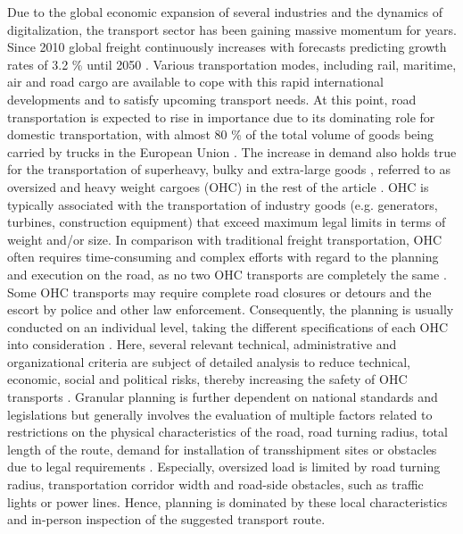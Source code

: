 
Due to the global economic expansion of several industries and the dynamics of digitalization, the transport sector has been gaining massive momentum for years.
Since 2010 global freight continuously increases with forecasts predicting growth rates of 3.2 \% until 2050 \cite{figura2020preferences, InternationalTransportForum}.
Various transportation modes, including rail, maritime, air and road cargo are available to cope with this rapid international developments and to satisfy upcoming transport needs.
At this point, road transportation is expected to rise in importance due to its dominating role for domestic transportation, with almost 80 \% of the total volume of goods being carried by trucks in the European Union \cite{Eurostat}.
The increase in demand also holds true for the transportation of superheavy, bulky and extra-large goods \cite{gavrilova2021analysis}, referred to as oversized and heavy weight cargoes (OHC) in the rest of the article \cite{Luo.2021}.
OHC is typically associated with the transportation of industry goods (e.g. generators, turbines, construction equipment) that exceed maximum legal limits in terms of weight and/or size.
In comparison with traditional freight transportation, OHC often requires time-consuming and complex efforts with regard to the planning and execution on the road, as no two OHC transports are completely the same \cite{Wolnowska.2019}.
Some OHC transports may require complete road closures or detours and the escort by police and other law enforcement.
Consequently, the planning is usually conducted on an individual level, taking the different specifications of each OHC into consideration \cite{Bazaras.2013}.
Here, several relevant technical, administrative and organizational criteria are subject of detailed analysis to reduce technical, economic, social and political risks, thereby increasing the safety of OHC transports \cite{Palsaitis.2012}.
Granular planning is further dependent on national standards and legislations but generally involves the evaluation of multiple factors related to restrictions on the physical characteristics of the road, road turning radius, total length of the route, demand for installation of transshipment sites or obstacles due to legal requirements \cite{PETRASKA.2018}.
Especially, oversized load is limited by road turning radius, transportation corridor width and road-side obstacles, such as traffic lights or power lines.
Hence, planning is dominated by these local characteristics and in-person inspection of the suggested transport route.
